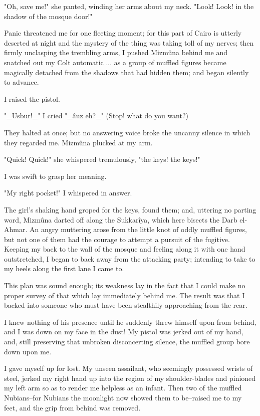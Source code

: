 "Oh, save me!" she panted, winding her arms about my neck. "Look!
Look! in the shadow of the mosque door!"

Panic threatened me for one fleeting moment; for this part of Cairo is
utterly deserted at night and the mystery of the thing was taking toll
of my nerves; then firmly unclasping the trembling arms, I pushed
Mizmûna behind me and snatched out my Colt automatic ... as a group of
muffled figures became magically detached from the shadows that had
hidden them; and began silently to advance.

I raised the pistol.

"_Usbur!_" I cried "_âuz eh?_" (Stop! what do you want?)

They halted at once; but no answering voice broke the uncanny silence
in which they regarded me. Mizmûna plucked at my arm.

"Quick! Quick!" she whispered tremulously, "the keys! the keys!"

I was swift to grasp her meaning.

"My right pocket!" I whispered in answer.

The girl's shaking hand groped for the keys, found them; and, uttering
no parting word, Mizmûna darted off along the Sukkarîya, which here
bisects the Darb el-Ahmar. An angry muttering arose from the little
knot of oddly muffled figures, but not one of them had the courage to
attempt a pursuit of the fugitive. Keeping my back to the wall of the
mosque and feeling along it with one hand outstretched, I began to
back away from the attacking party; intending to take to my heels
along the first lane I came to.

This plan was sound enough; its weakness lay in the fact that I could
make no proper survey of that which lay immediately behind me. The
result was that I backed into someone who must have been stealthily
approaching from the rear.

I knew nothing of his presence until he suddenly threw himself upon
from behind, and I was down on my face in the dust! My pistol was
jerked out of my hand, and, still preserving that unbroken
disconcerting silence, the muffled group bore down upon me.

I gave myself up for lost. My unseen assailant, who seemingly
possessed wrists of steel, jerked my right hand up into the region of
my shoulder-blades and pinioned my left arm so as to render me
helpless as an infant. Then two of the muffled Nubians--for Nubians
the moonlight now showed them to be--raised me to my feet, and the
grip from behind was removed.

